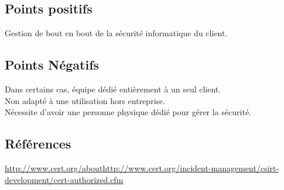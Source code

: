\subsection{Points positifs}
Gestion de bout en bout de la sécurité informatique du client.

\subsection{Points Négatifs}
Dans certains cas, équipe dédié entièrement à un seul client.\\
Non adapté à une utilisation hors entreprise.\\
Nécessite d’avoir une personne physique dédié pour gérer la sécurité.\\

\subsection{Références}
\small
\noindent
[1][2] \url{http://www.cert.org/about}\newline
[3][4] \url{http://www.cert.org/incident-management/csirt-development/cert-authorized.cfm}\newline
\normalsize